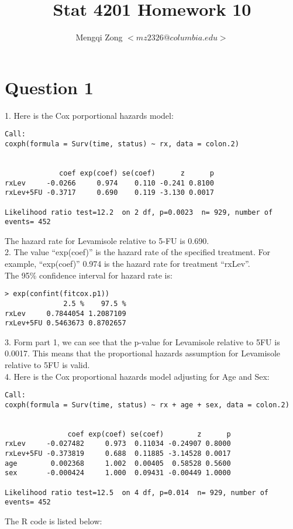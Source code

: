 \documentclass[12pt]{article}
\title{Stat 4201 Homework 10}
\author{Mengqi Zong $<mz2326@columbia.edu>$}
\begin{document}
\maketitle

\setlength{\parindent}{0in}

\section*{Question 1}

1. Here is the Cox porportional hazards model:

\begin{verbatim}
Call:
coxph(formula = Surv(time, status) ~ rx, data = colon.2)


             coef exp(coef) se(coef)      z      p
rxLev     -0.0266     0.974    0.110 -0.241 0.8100
rxLev+5FU -0.3717     0.690    0.119 -3.130 0.0017

Likelihood ratio test=12.2  on 2 df, p=0.0023  n= 929, number of events= 452
\end{verbatim}

The hazard rate for Levamisole relative to 5-FU is 0.690. \\

2. The value ``exp(coef)'' is the hazard rate of the specified
treatment. For example, ``exp(coef)'' 0.974 is the hazard rate for
treatment ``rxLev''. \\

The 95\% confidence interval for hazard rate is:

\begin{verbatim}
> exp(confint(fitcox.p1))
              2.5 %    97.5 %
rxLev     0.7844054 1.2087109
rxLev+5FU 0.5463673 0.8702657
\end{verbatim}

3. Form part 1, we can see that the p-value for Levamisole relative to
5FU is 0.0017. This means that the proportional hazards assumption for
Levamisole relative to 5FU is valid. \\

4. Here is the Cox proportional hazards model adjusting for Age and Sex:

\begin{verbatim}
Call:
coxph(formula = Surv(time, status) ~ rx + age + sex, data = colon.2)


               coef exp(coef) se(coef)        z      p
rxLev     -0.027482     0.973  0.11034 -0.24907 0.8000
rxLev+5FU -0.373819     0.688  0.11885 -3.14528 0.0017
age        0.002368     1.002  0.00405  0.58528 0.5600
sex       -0.000424     1.000  0.09431 -0.00449 1.0000

Likelihood ratio test=12.5  on 4 df, p=0.014  n= 929, number of events= 452
\end{verbatim}

\appendix
\appendixpage
\addappheadtotoc

The R code is listed below:


\end{document}
